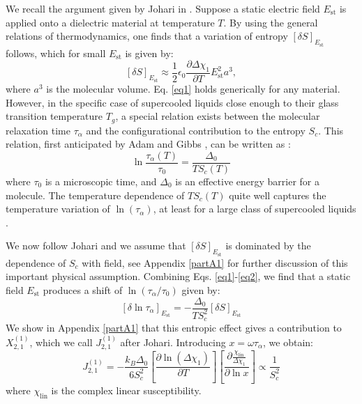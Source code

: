\documentclass[single column,pre]{revtex4}
\begin{document}
We recall the argument given by Johari in \cite{Joh13,Joh16}. Suppose a static electric field $E_{\text{st}}$ is applied onto a dielectric material at temperature $T$. 
By using the general relations of thermodynamics, one finds that a variation of 
entropy $\left[ \delta S \right]_{E_{\text{st}}}$ follows, which for small $E_{\text{st}}$ is given by:
\begin{equation}
\left[\delta S \right]_{E_{\text{st}}} \approx \frac{1}{2} \epsilon_0 \frac{\partial \Delta \chi_1}{\partial T} E_{\text{st}}^2 a^3,
\label{eq1}
\end{equation}
where $a^3$ is the molecular volume. Eq. \ref{eq1} holds generically for any material. However, in the specific case of supercooled liquids close enough to their glass transition temperature $T_g$, a special 
relation exists between the molecular relaxation time $\tau_{\alpha}$ and the configurational contribution to the entropy $S_c$. 
This relation, first anticipated by Adam and Gibbs \cite{Ada65}, 
can be written as :  
\begin{equation}
\ln{\frac{\tau_{\alpha}(T)}{\tau_0}}= \frac{{\Delta_0}}{T S_c(T)} 
\label{eq2}
\end{equation}
where $\tau_{0}$ is a microscopic time, and $\Delta_0$ is an effective energy barrier for a molecule. The temperature dependence of $T S_c(T)$ quite well captures the 
temperature variation of $\ln(\tau_{\alpha})$, at least for a large class of supercooled liquids \cite{Ric98}. 

We now follow Johari \cite{Joh13,Joh16} and we assume that $\left[\delta S \right]_{E_{\text{st}}}$ is dominated by the dependence of $S_c$ with field, see Appendix \ref{partA1} for further discussion of this important physical assumption. Combining Eqs. \ref{eq1}-\ref{eq2}, we find that a static field $E_{\text{st}}$ produces a shift of $\ln(\tau_{\alpha}/\tau_0)$ given by:
\begin{equation}
\left[\delta \ln{\tau_{\alpha}} \right]_{E_{\text{st}}} = -\frac{{\Delta_0}}{T S_c^2} \left[ \delta S \right]_{E_{\text{st}}}
\label{eq3}
\end{equation} 
We show in Appendix \ref{partA1} that this entropic effect gives a contribution to $X_{2,1}^{(1)}$, which we call $J_{2,1}^{(1)}$ after Johari. Introducing $x=\omega \tau_{\alpha}$, we obtain: 
\begin{equation}
J_{2,1}^{(1)} = -\frac{{k_B \Delta_0}}{6S_c^2} \left[\frac{\partial \ln{(\Delta \chi_1)}}{\partial T}\right] \left[ \frac{ \partial \frac{\chi_{\text{lin}}}{\Delta \chi_1} }{\partial \ln{x}}\right] \propto \frac{1}{S_c^2}
\label{eq9}
\end{equation}
where $\chi_{\text{lin}}$ is the complex linear susceptibility. 
\end{document}
